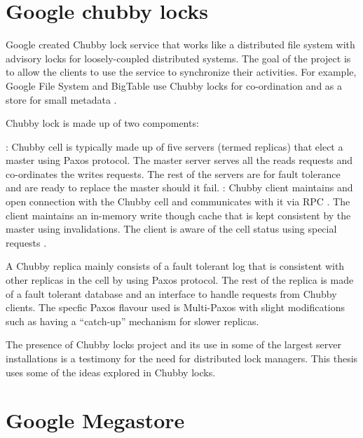 \section{Google chubby locks}
\label{section:chubby.locks}

Google created Chubby lock service \citep{Burrows06} that works like a 
distributed file system with advisory locks for loosely-coupled distributed 
systems. The goal of the project is to allow the clients to use the service
to synchronize their activities. For example, Google File System \citep{gfs} 
and BigTable \citep{ChangDGHWBCFG06} use Chubby locks for co-ordination and
as a store for small metadata \citep{ChandraGR07}.

Chubby lock is made up of two compoments:

\begin{itemize}
    : Chubby cell is typically made up of five servers 
    (termed replicas) that elect a master using Paxos protocol. The master
    server serves all the reads requests and co-ordinates the writes requests.
    The rest of the servers are for fault tolerance and are ready to replace the
    master should it fail.
    : Chubby client maintains and open connection with
    the Chubby cell and communicates with it via RPC%
    . The client maintains an in-memory write though cache that
    is kept consistent by the master using invalidations. The client is
    aware of the cell status using special requests%
    .
\end{itemize}

A Chubby replica mainly consists of a fault tolerant log that is consistent
with other replicas in the cell by using Paxos protocol. The rest of the
replica is made of a fault tolerant database and an interface to handle
requests from Chubby clients. The specfic Paxos flavour used is Multi-Paxos
with slight modifications such as having a ``catch-up'' mechanism for
slower replicas.

The presence of Chubby locks project and its use in some of the largest 
server installations is a testimony for the need for distributed lock
managers. This thesis uses some of the ideas explored in Chubby locks.

\section{Google Megastore}

